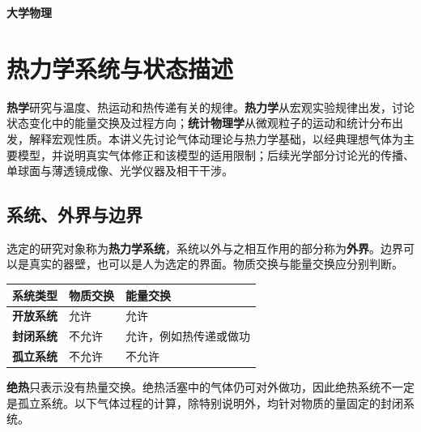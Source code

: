 \documentclass[UTF8,fontset=none,zihao=-4,a4paper]{ctexart}
\newcommand{\term}[1]{\textbf{#1}}
\begin{document}
\begin{titlepage}
\thispagestyle{empty}
\vspace*{0.28\textheight}
\begin{center}
{\fontsize{36}{45}\selectfont\bfseries 大学物理}
\end{center}
\end{titlepage}
\thispagestyle{empty}
\tableofcontents
\clearpage
{}

\section{热力学系统与状态描述}
\term{热学}研究与温度、热运动和热传递有关的规律。\term{热力学}从宏观实验规律出发，讨论状态变化中的能量交换及过程方向；\term{统计物理学}从微观粒子的运动和统计分布出发，解释宏观性质。本讲义先讨论气体动理论与热力学基础，以经典理想气体为主要模型，并说明真实气体修正和该模型的适用限制；后续光学部分讨论光的传播、单球面与薄透镜成像、光学仪器及相干干涉。

\subsection{系统、外界与边界}
选定的研究对象称为\term{热力学系统}，系统以外与之相互作用的部分称为\term{外界}。边界可以是真实的器壁，也可以是人为选定的界面。物质交换与能量交换应分别判断。
\begin{center}
\begin{tabularx}{\linewidth}{l Y Y}
\toprule
系统类型 & 物质交换 & 能量交换\\
\midrule
\term{开放系统} & 允许 & 允许\\
\term{封闭系统} & 不允许 & 允许，例如热传递或做功\\
\term{孤立系统} & 不允许 & 不允许\\
\bottomrule
\end{tabularx}
\end{center}
\term{绝热}只表示没有热量交换。绝热活塞中的气体仍可对外做功，因此绝热系统不一定是孤立系统。以下气体过程的计算，除特别说明外，均针对物质的量固定的封闭系统。
\end{document}
